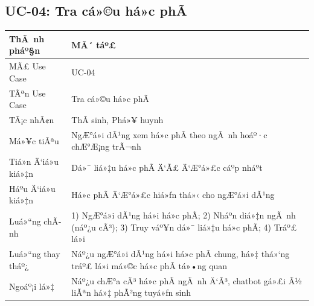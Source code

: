 ﻿\documentclass[12pt,a4paper]{report}
\begin{document}
\subsection{UC-04: Tra cá»©u há»c phÃ­}
\begin{table}[H]
\centering
\begin{tabular}{|p{3.5cm}|p{8.5cm}|}
\hline
\textbf{ThÃ nh pháº§n} & \textbf{MÃ´ táº£} \\ \hline
MÃ£ Use Case & UC-04 \\ \hline
TÃªn Use Case & Tra cá»©u há»c phÃ­ \\ \hline
TÃ¡c nhÃ¢n & ThÃ­ sinh, Phá»¥ huynh \\ \hline
Má»¥c tiÃªu & NgÆ°á»i dÃ¹ng xem há»c phÃ­ theo ngÃ nh hoáº·c chÆ°Æ¡ng trÃ¬nh \\ \hline
Tiá»n Ä‘iá»u kiá»‡n & Dá»¯ liá»‡u há»c phÃ­ Ä‘Ã£ Ä‘Æ°á»£c cáº­p nháº­t \\ \hline
Háº­u Ä‘iá»u kiá»‡n & Há»c phÃ­ Ä‘Æ°á»£c hiá»ƒn thá»‹ cho ngÆ°á»i dÃ¹ng \\ \hline
Luá»“ng chÃ­nh & 1) NgÆ°á»i dÃ¹ng há»i há»c phÃ­; 2) Nháº­n diá»‡n ngÃ nh (náº¿u cÃ³); 3) Truy váº¥n dá»¯ liá»‡u há»c phÃ­; 4) Tráº£ lá»i \\ \hline
Luá»“ng thay tháº¿ & Náº¿u ngÆ°á»i dÃ¹ng há»i há»c phÃ­ chung, há»‡ thá»‘ng tráº£ lá»i má»©c há»c phÃ­ tá»•ng quan \\ \hline
Ngoáº¡i lá»‡ & Náº¿u chÆ°a cÃ³ há»c phÃ­ ngÃ nh Ä‘Ã³, chatbot gá»£i Ã½ liÃªn há»‡ phÃ²ng tuyá»ƒn sinh \\ \hline
\end{tabular}
\end{table}
\end{document}
